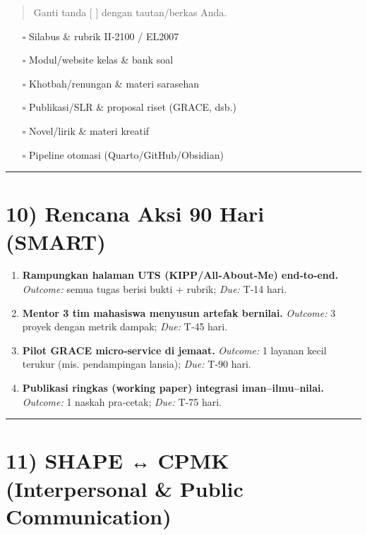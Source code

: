 \documentclass[
  letterpaper,
  DIV=11,
  numbers=noendperiod]{scrreprt}
\providecommand{\tightlist}{%
  \setlength{\itemsep}{0pt}\setlength{\parskip}{0pt}}
\begin{document}
\begin{quote}
Ganti tanda {[} {]} dengan tautan/berkas Anda.
\end{quote}

\begin{itemize}
\tightlist
\item[$\square$]
  Silabus \& rubrik II‑2100 / EL2007
\item[$\square$]
  Modul/website kelas \& bank soal
\item[$\square$]
  Khotbah/renungan \& materi sarasehan
\item[$\square$]
  Publikasi/SLR \& proposal riset (GRACE, dsb.)
\item[$\square$]
  Novel/lirik \& materi kreatif
\item[$\square$]
  Pipeline otomasi (Quarto/GitHub/Obsidian)
\end{itemize}

\begin{center}\rule{0.5\linewidth}{0.5pt}\end{center}

\section{10) Rencana Aksi 90 Hari
(SMART)}\label{rencana-aksi-90-hari-smart}

\begin{enumerate}
\def\labelenumi{\arabic{enumi}.}
\tightlist
\item
  \textbf{Rampungkan halaman UTS (KIPP/All‑About‑Me) end‑to‑end.}
  \emph{Outcome:} semua tugas berisi bukti + rubrik; \emph{Due:} T‑14
  hari.
\item
  \textbf{Mentor 3 tim mahasiswa menyusun artefak bernilai.}
  \emph{Outcome:} 3 proyek dengan metrik dampak; \emph{Due:} T‑45 hari.
\item
  \textbf{Pilot GRACE micro‑service di jemaat.} \emph{Outcome:} 1
  layanan kecil terukur (mis. pendampingan lansia); \emph{Due:} T‑90
  hari.
\item
  \textbf{Publikasi ringkas (working paper) integrasi
  iman--ilmu--nilai.} \emph{Outcome:} 1 naskah pra‑cetak; \emph{Due:}
  T‑75 hari.
\end{enumerate}

\begin{center}\rule{0.5\linewidth}{0.5pt}\end{center}

\section{11) SHAPE ↔ CPMK (Interpersonal \& Public
Communication)}\label{shape-cpmk-interpersonal-public-communication}
\end{document}
